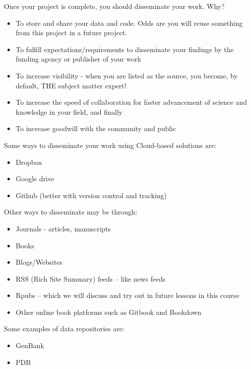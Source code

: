\documentclass[
]{book}
\providecommand{\tightlist}{%
  \setlength{\itemsep}{0pt}\setlength{\parskip}{0pt}}
\begin{document}
Once your project is complete, you should disseminate your work. Why?

\begin{itemize}
\tightlist
\item
  To store and share your data and code. Odds are you will reuse something from this project in a future project.
\item
  To fulfill expectations/requirements to disseminate your findings by the funding agency or publisher of your work
\item
  To increase visibility - when you are listed as the source, you become, by default, THE subject matter expert!
\item
  To increase the speed of collaboration for faster advancement of science and knowledge in your field, and finally
\item
  To increase goodwill with the community and public
\end{itemize}

Some ways to disseminate your work using Cloud-based solutions are:

\begin{itemize}
\tightlist
\item
  Dropbox
\item
  Google drive
\item
  Github (better with version control and tracking)
\end{itemize}

Other ways to disseminate may be through:

\begin{itemize}
\tightlist
\item
  Journals - articles, manuscripts
\item
  Books
\item
  Blogs/Websites
\item
  RSS (Rich Site Summary) feeds -- like news feeds
\item
  Rpubs -- which we will discuss and try out in future lessons in this course
\item
  Other online book platforms such as Gitbook and Bookdown
\end{itemize}

Some examples of data repositories are:

\begin{itemize}
\tightlist
\item
  GenBank
\item
  PDB
\end{itemize}
\end{document}
